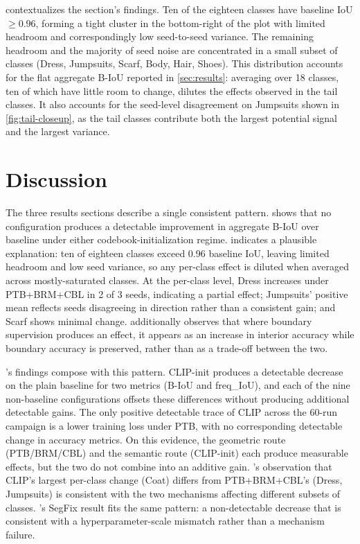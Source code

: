 \documentclass{article}
\theoremstyle{plain}
\theoremstyle{definition}
\theoremstyle{remark}
\begin{document}
 contextualizes the section's findings. Ten of the eighteen classes have baseline IoU $\geq 0.96$, forming a tight cluster in the bottom-right of the plot with limited headroom and correspondingly low seed-to-seed variance. The remaining headroom and the majority of seed noise are concentrated in a small subset of classes (Dress, Jumpsuits, Scarf, Body, Hair, Shoes). This distribution accounts for the flat aggregate B-IoU reported in \cref{sec:results}: averaging over 18 classes, ten of which have little room to change, dilutes the effects observed in the tail classes. It also accounts for the seed-level disagreement on Jumpsuits shown in \cref{fig:tail-closeup}, as the tail classes contribute both the largest potential signal and the largest variance.

\section{Discussion}
\label{sec:discussion}
The three results sections describe a single consistent pattern.  shows that no configuration produces a detectable improvement in aggregate B-IoU over baseline under either codebook-initialization regime.  indicates a plausible explanation: ten of eighteen classes exceed 0.96 baseline IoU, leaving limited headroom and low seed variance, so any per-class effect is diluted when averaged across mostly-saturated classes. At the per-class level, Dress increases under PTB+BRM+CBL in 2 of 3 seeds, indicating a partial effect; Jumpsuits' positive mean reflects seeds disagreeing in direction rather than a consistent gain; and Scarf shows minimal change.  additionally observes that where boundary supervision produces an effect, it appears as an increase in interior accuracy while boundary accuracy is preserved, rather than as a trade-off between the two.

's findings compose with this pattern. CLIP-init produces a detectable decrease on the plain baseline for two metrics (B-IoU and freq\_IoU), and each of the nine non-baseline configurations offsets these differences without producing additional detectable gains. The only positive detectable trace of CLIP across the 60-run campaign is a lower training loss under PTB, with no corresponding detectable change in accuracy metrics. On this evidence, the geometric route (PTB/BRM/CBL) and the semantic route (CLIP-init) each produce measurable effects, but the two do not combine into an additive gain. 's observation that CLIP's largest per-class change (Coat) differs from PTB+BRM+CBL's (Dress, Jumpsuits) is consistent with the two mechanisms affecting different subsets of classes. 's SegFix result fits the same pattern: a non-detectable decrease that is consistent with a hyperparameter-scale mismatch rather than a mechanism failure.
\end{document}
